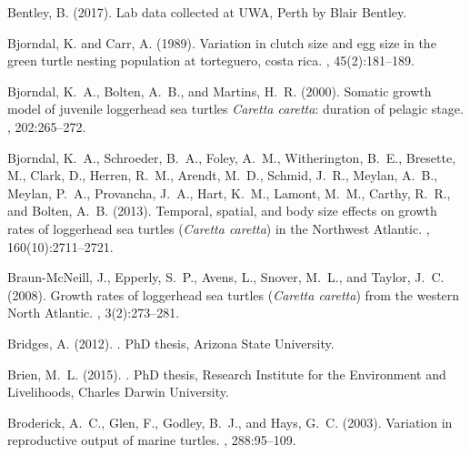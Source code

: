\documentclass{article}
\begin{document}
\begin{thebibliography}{}
Bentley, B. (2017).
\newblock Lab data collected at UWA, Perth by Blair Bentley.

Bjorndal, K. and Carr, A. (1989).
\newblock Variation in clutch size and egg size in the green turtle nesting
  population at torteguero, costa rica.
, 45(2):181--189.

Bjorndal, K.~A., Bolten, A.~B., and Martins, H.~R. (2000).
\newblock Somatic growth model of juvenile loggerhead sea turtles
  \textit{Caretta caretta}: duration of pelagic stage.
, 202:265--272.

Bjorndal, K.~A., Schroeder, B.~A., Foley, A.~M., Witherington, B.~E., Bresette,
  M., Clark, D., Herren, R.~M., Arendt, M.~D., Schmid, J.~R., Meylan, A.~B.,
  Meylan, P.~A., Provancha, J.~A., Hart, K.~M., Lamont, M.~M., Carthy, R.~R.,
  and Bolten, A.~B. (2013).
\newblock Temporal, spatial, and body size effects on growth rates of
  loggerhead sea turtles (\textit{Caretta caretta}) in the {N}orthwest
  {A}tlantic.
, 160(10):2711--2721.

Braun-Mc{N}eill, J., Epperly, S.~P., Avens, L., Snover, M.~L., and Taylor,
  J.~C. (2008).
\newblock Growth rates of loggerhead sea turtles (\textit{Caretta caretta})
  from the western {N}orth {A}tlantic.
, 3(2):273--281.

Bridges, A. (2012).
.
\newblock PhD thesis, Arizona State University.

Brien, M.~L. (2015).
.
\newblock PhD thesis, Research Institute for the Environment and Livelihoods,
  Charles Darwin University.

Broderick, A.~C., Glen, F., Godley, B.~J., and Hays, G.~C. (2003).
\newblock Variation in reproductive output of marine turtles.
,
  288:95--109.


\end{thebibliography}
\end{document}
